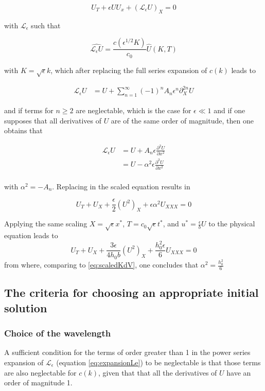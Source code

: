 $$ U_T + \epsilon U U_x+(\mathcal{L}_{\epsilon} U)_{X} = 0$$

\noindent with $\mathcal{L}_\epsilon$ such that 

$$ \widehat{\mathcal{L}_\epsilon U} = \frac{c(\epsilon^{1/2} K)}{c_0} \hat{U}(K,T)$$ 

\noindent with $K=\sqrt{\epsilon} k$, which after replacing the full series expansion of $c(k)$ leads to

\begin{align}
  \label{eq:expansionLe}
    \mathcal{L}_\epsilon U &=U +\sum_{n=1}^\infty (-1)^n A_n \epsilon^n \partial_X^{2n} U    
\end{align}

\noindent and if terms for $n\geq2$ are neglectable, which is the case for $\epsilon \ll 1 $ and if one supposes that all derivatives of $U$ are of the same order of magnitude, then one obtains that

\begin{align*}
    \mathcal{L}_\epsilon U &= U + A_n \epsilon \frac{\partial^2 U}{\partial x^2} \\
    &= U - \alpha^2 \epsilon \frac{\partial^2 U}{\partial x^2} \\
\end{align*}

\noindent with $\alpha^2 = - A_n$. Replacing in the scaled equation results in

$$U_T + U_X + \frac{\epsilon}{2} (U^2)_X + \epsilon\alpha^2U_{XXX} = 0$$

\indent Applying the same scaling $ X=\sqrt{\epsilon}x^*$, $T =c_0 \sqrt{\epsilon} t^*$, and $u^* = \frac{\epsilon}{ b} U$ to the physical equation leads to $$U_T + U_X + \frac{3\epsilon}{4h_0b} (U^2)_X + \frac{h_0^2\epsilon}{6}U_{XXX} = 0$$
from where, comparing to \eqref{eq:scaledKdV}, one concludes that $ \alpha^2 = \frac{h_0^2}{6} $

\subsection{The criteria for choosing an appropriate initial solution}

\subsubsection{Choice of the wavelength}

\indent A sufficient condition for the terms of order greater than 1 in the power series expansion of $\mathcal{L}_\epsilon$  (equation \eqref{eq:expansionLe}) to be neglectable is that those terms are also neglectable for $c(k)$, given that that all the derivatives of $U$ have an order of magnitude 1.

